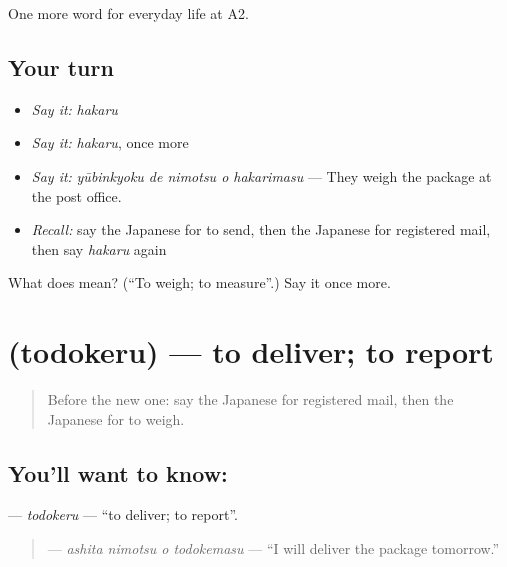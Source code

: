 \begin{grammarlens}[title={What you've built}]
One more word for everyday life at A2.
\end{grammarlens}

\subsection*{Your turn}
\begin{itemize}
\raggedright
  \item \emph{Say it:} \emph{hakaru}
  \item \emph{Say it:} \emph{hakaru}, once more
  \item \emph{Say it:} \emph{yūbinkyoku de nimotsu o hakarimasu} — They weigh the package at the post office.
  \item \emph{Recall:} say the Japanese for to send, then the Japanese for registered mail, then say \emph{hakaru} again
\end{itemize}

\begin{tcolorbox}[breakable,colback=teal!4,colframe=teal!35!black,title={Before you move on}]
What does  mean? (\textquotedblleft{}To weigh; to measure\textquotedblright{}.) Say it once more.
\end{tcolorbox}
\section[\texorpdfstring{\ja{とどける} (todokeru)}{とどける (todokeru)}]{ (todokeru) — to deliver; to report}

\label{lesson:JA-C189-todokeru}



\begin{quote}
Before the new one: say the Japanese for registered mail, then the Japanese for to weigh.
\end{quote}

\subsection*{You'll want to know: }
\textbf{} — \emph{todokeru} — \textquotedblleft{}to deliver; to report\textquotedblright{}.

\begin{quote}
\textbf{  } — \emph{ashita nimotsu o todokemasu} — \textquotedblleft{}I will deliver the package tomorrow.\textquotedblright{}
\end{quote}

